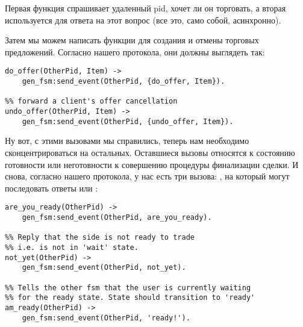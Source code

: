 Первая функция спрашивает удаленный pid, хочет ли он торговать, а вторая используется для ответа на этот вопрос (все это, само собой, асинхронно).

Затем мы можем написать функции для создания и отмены торговых предложений.
Согласно нашего протокола, они должны выглядеть так:
\begin{lstlisting}[style=erlang]
%% forward a client's offer
do_offer(OtherPid, Item) ->
	gen_fsm:send_event(OtherPid, {do_offer, Item}).
 
%% forward a client's offer cancellation
undo_offer(OtherPid, Item) ->
	gen_fsm:send_event(OtherPid, {undo_offer, Item}).
\end{lstlisting}

Ну вот, с этими вызовами мы справились, теперь нам необходимо сконцентрироваться на остальных.
Оставшиеся вызовы относятся к состоянию готовности или неготовности к совершению процедуры финализации сделки.
И снова, согласно нашего протокола, у нас есть три вызова: , на который могут последовать ответы   или :

\begin{lstlisting}[style=erlang]
%% Ask the other side if he's ready to trade.
are_you_ready(OtherPid) ->
	gen_fsm:send_event(OtherPid, are_you_ready).
 
%% Reply that the side is not ready to trade
%% i.e. is not in 'wait' state.
not_yet(OtherPid) ->
	gen_fsm:send_event(OtherPid, not_yet).
 
%% Tells the other fsm that the user is currently waiting
%% for the ready state. State should transition to 'ready'
am_ready(OtherPid) ->
	gen_fsm:send_event(OtherPid, 'ready!').
\end{lstlisting}

